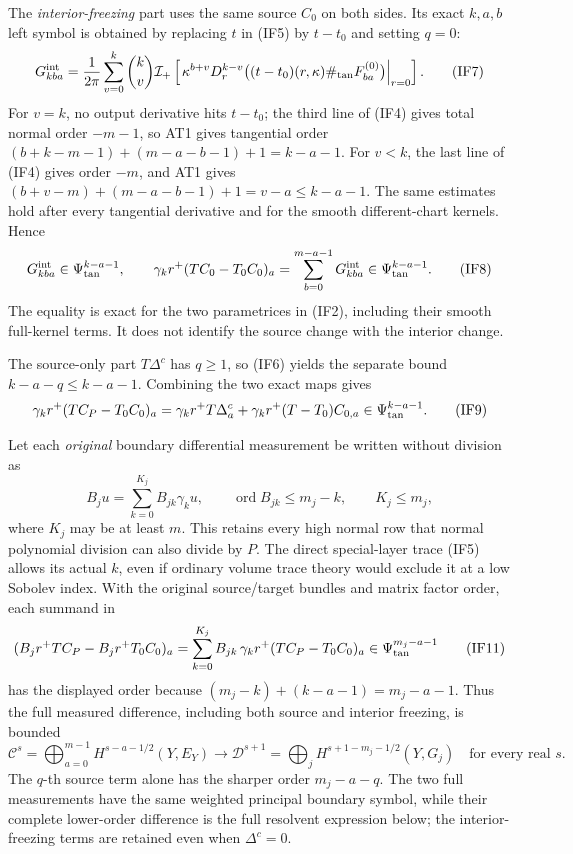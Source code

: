 \documentclass[
  11pt,
]{article}
\begin{document}
The \emph{interior-freezing} part uses the same source \(C_0\) on both
sides. Its exact \(k,a,b\) left symbol is obtained by replacing \(t\) in
(IF5) by \(t-t_0\) and setting \(q=0\): \[
 G^{\mathrm{int}}_{kba}
 =\frac1{2\pi}\sum_{v=0}^k\binom{k}{v}
   \mathcal I_+\left[
     \left.\kappa^{b+v}D_r^{k-v}
       \bigl((t-t_0)(r,\kappa)\#_{\rm tan}F_{ba}^{(0)}\bigr)
     \right|_{r=0}\right].
 \tag{IF7}
\] For \(v=k\), no output derivative hits \(t-t_0\); the third line of
(IF4) gives total normal order \(-m-1\), so AT1 gives tangential order
\((b+k-m-1)+(m-a-b-1)+1=k-a-1\). For \(v<k\), the last line of (IF4)
gives order \(-m\), and AT1 gives \((b+v-m)+(m-a-b-1)+1=v-a\leq k-a-1\).
The same estimates hold after every tangential derivative and for the
smooth different-chart kernels. Hence \[
 G^{\mathrm{int}}_{kba}\in\Psi_{\rm tan}^{k-a-1},
 \qquad
 \gamma_k r^+(TC_0-T_0C_0)_a
    =\sum_{b=0}^{m-a-1}G^{\mathrm{int}}_{kba}
    \in\Psi_{\rm tan}^{k-a-1}.
 \tag{IF8}
\] The equality is exact for the two parametrices in (IF2), including
their smooth full-kernel terms. It does not identify the source change
with the interior change.

The source-only part \(T\Delta^c\) has \(q\geq1\), so (IF6) yields the
separate bound \(k-a-q\leq k-a-1\). Combining the two exact maps gives
\[
 \gamma_k r^+(TC_P-T_0C_0)_a
 =\gamma_k r^+T\Delta^c_a
  +\gamma_k r^+(T-T_0)C_{0,a}
 \in\Psi_{\rm tan}^{k-a-1}.
 \tag{IF9}
\]

Let each \emph{original} boundary differential measurement be written
without division as \[
 B_j u=\sum_{k=0}^{K_j}B_{jk}\gamma_k u,\qquad
 \operatorname{ord}B_{jk}\leq m_j-k,\qquad K_j\leq m_j,
 \tag{IF10}
\] where \(K_j\) may be at least \(m\). This retains every high normal
row that normal polynomial division can also divide by \(P\). The direct
special-layer trace (IF5) allows its actual \(k\), even if ordinary
volume trace theory would exclude it at a low Sobolev index. With the
original source/target bundles and matrix factor order, each summand in
\[
 (B_jr^+TC_P-B_jr^+T_0C_0)_a
 =\sum_{k=0}^{K_j}B_{jk}\,
       \gamma_k r^+(TC_P-T_0C_0)_a
 \in\Psi_{\rm tan}^{m_j-a-1}
 \tag{IF11}
\] has the displayed order because \((m_j-k)+(k-a-1)=m_j-a-1\). Thus the
full measured difference, including both source and interior freezing,
is bounded \[
 \mathcal C^s=\bigoplus_{a=0}^{m-1}H^{s-a-1/2}(Y,E_Y)
 \longrightarrow
 \mathcal D^{s+1}=\bigoplus_jH^{s+1-m_j-1/2}(Y,G_j)
 \quad\text{for every real }s.
 \tag{IF12}
\] The \(q\)-th source term alone has the sharper order \(m_j-a-q\). The
two full measurements have the same weighted principal boundary symbol,
while their complete lower-order difference is the full resolvent
expression below; the interior-freezing terms are retained even when
\(\Delta^c=0\).
\end{document}
